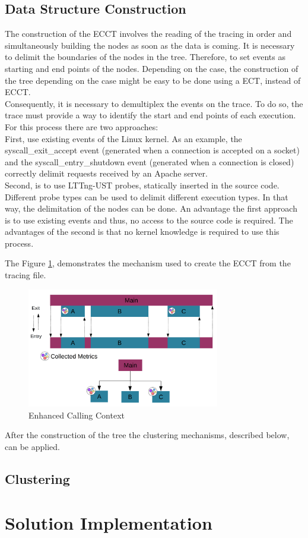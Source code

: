 \subsection{Data Structure Construction}
    The construction of the ECCT involves the reading of the tracing in order and simultaneously building the nodes as soon as the data is coming. It is necessary to delimit the boundaries of the nodes in the tree. Therefore, to set events as starting and end points of the nodes. Depending on the case, the construction of the tree depending on the case might be easy to be done using a ECT, instead of ECCT.\\
    Consequently, it is necessary to demultiplex the events on the trace. To do so, the trace must provide a way to identify the start and end points of each execution. 
    For this process there are two approaches:\\
    First, use existing events of the Linux kernel. As an example, the syscall\_exit\_accept event (generated when a connection is accepted on a socket) and the syscall\_entry\_shutdown event (generated when a connection is closed) correctly delimit requests received by an Apache server. \\
    Second, is to use LTTng-UST probes, statically inserted in the source code. Different probe types can be used to delimit different execution types. In that way, the delimitation of the nodes can be done.
    An advantage the first approach is to use existing events and thus, no access to the source code is required. The advantages of the second is that no kernel knowledge is required to use this process.
    
    The Figure \ref{fig:ecct_build}, demonstrates the mechanism used to create the ECCT from the tracing file.
    
\begin{figure}[h]
      \centering
        \includegraphics[width=0.750\textwidth]{figures/ecct.png}
        \caption{Enhanced Calling Context}
        \label{fig:ecct_build}
    \end{figure}
    
    After the construction of the tree the clustering mechanisms, described below, can be applied.\\
  
\subsection{Clustering}
\label{sec:clustering}
    
    
\section{Solution Implementation}
\label{sec:implementaion}
    
    